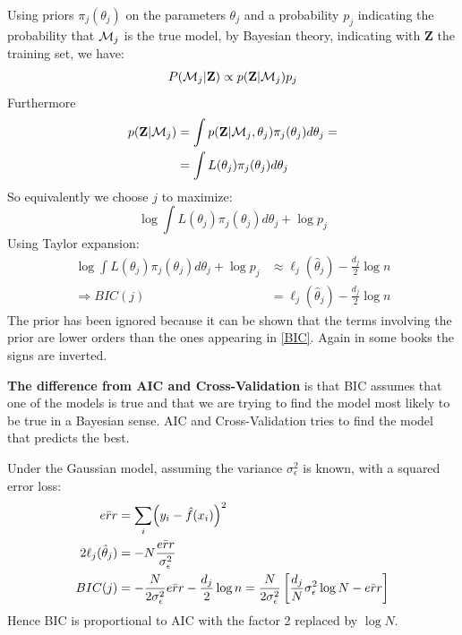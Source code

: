 \documentclass[12pt, letterpaper]{article}
\theoremstyle{definition}
\DeclarePairedDelimiter\autobracket{(}{)}
\newcommand{\br}[1]{\autobracket*{#1}}
\begin{document}
Using priors $\pi_j(\theta_j)$ on the parameters $\theta_j$ and a probability $p_j$ indicating the probability that  $\CMcal{M}_j$ is the true model, by Bayesian theory, indicating with $\mathbf{Z}$ the training set, we have:
\begin{equation}
P(\CMcal{M}_j|\mathbf{Z}) \propto p(\mathbf{Z}|\CMcal{M}_j) p_j
\end{equation}
Furthermore
\begin{equation}
\begin{aligned}
p(\mathbf{Z}|\CMcal{M}_j) &= \int p(\mathbf{Z}|\CMcal{M}_j,\theta_j)\pi_j(\theta_j) d\theta_j = \\
&=\int L(\theta_j)\pi_j(\theta_j) d\theta_j
\end{aligned}
\end{equation}
So equivalently we choose $j$ to maximize:
\begin{equation}
\log \int L(\theta_j)\pi_j(\theta_j) d\theta_j + \log p_j
\end{equation}
Using Taylor expansion:
\begin{equation}
\begin{aligned}
\log \int L(\theta_j)\pi_j(\theta_j) d\theta_j + \log p_j &\approx \ell_j(\hat{\theta}_j) - \frac{d_j}{2}\log n \\
\Rightarrow BIC(j) &= \ell_j(\hat{\theta}_j) - \frac{d_j}{2}\log n
\end{aligned}
\label{BIC}
\end{equation}
The prior has been ignored because it can be shown that the terms involving the prior are lower orders than the ones appearing in \autoref{BIC}. Again in some books the signs are inverted.

\textbf{The difference from AIC and Cross-Validation} is that BIC assumes that one of the models is true and that we are trying to find the model most likely to be true in a Bayesian sense. AIC and Cross-Validation tries to find the model that predicts the best.

Under the Gaussian model, assuming the variance $\sigma_\epsilon^2$ is known, with a squared error loss:
\begin{equation}
\begin{aligned}
\bar{err} &=  \sum_i\br{y_i - \hat{f}(x_i)}^2\\
2 \ell_j(\hat{\theta}_j) &= -N\frac{\bar{err}}{\sigma_\epsilon^2}\\
BIC(j) &= -\frac{N}{2\sigma_\epsilon^2}\bar{err} - \frac{d_j}{2}\log n = \frac{N}{2\sigma_\epsilon^2} \left[ \frac{d_j}{N} \sigma_\epsilon^2 \log N - \bar{err} \right]
\end{aligned}
\end{equation}
Hence BIC is proportional to AIC with the factor 2 replaced by $\log N$.
\end{document}
